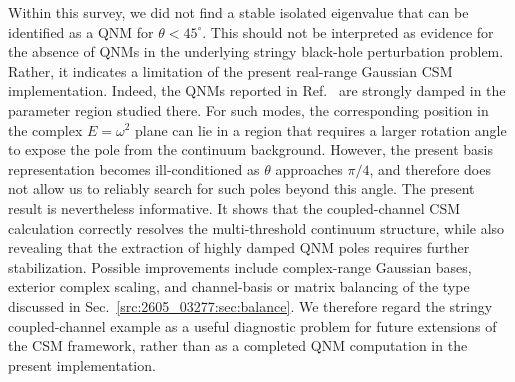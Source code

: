 Within this survey, we did not find a stable isolated eigenvalue that can be
identified as a QNM for $\theta<45^\circ$.
This should not be interpreted as evidence for the absence of QNMs in the
underlying stringy black-hole perturbation problem.
Rather, it indicates a limitation of the present real-range Gaussian CSM
implementation.
Indeed, the QNMs reported in Ref.~\cite{Bian:2026crb} are strongly damped in
the parameter region studied there.
For such modes, the corresponding position in the complex
$E=\omega^2$ plane can lie in a region that requires a larger rotation angle
to expose the pole from the continuum background.
However, the present basis representation becomes ill-conditioned as
$\theta$ approaches $\pi/4$, and therefore does not allow us to reliably
search for such poles beyond this angle.
The present result is nevertheless informative.
It shows that the coupled-channel CSM calculation correctly resolves the
multi-threshold continuum structure, while also revealing that the extraction
of highly damped QNM poles requires further stabilization.
Possible improvements include complex-range Gaussian bases, exterior complex
scaling, and channel-basis or matrix balancing of the type discussed in
Sec.~\ref{src:2605_03277:sec:balance}.
We therefore regard the stringy coupled-channel example as a useful
diagnostic problem for future extensions of the CSM framework, rather than as
a completed QNM computation in the present implementation.
